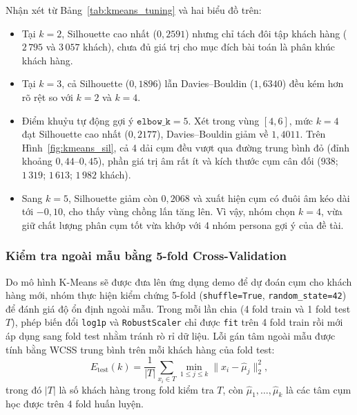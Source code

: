 \documentclass[12pt,a4paper]{article}
\numberwithin{equation}{section}
\numberwithin{table}{section}
\numberwithin{figure}{section}
\begin{document}
Nhận xét từ Bảng~\ref{tab:kmeans_tuning} và hai biểu đồ trên:
\begin{itemize}[leftmargin=1.5em]
    \item Tại $k = 2$, Silhouette cao nhất ($0,2591$) nhưng chỉ tách đôi tập khách hàng ($2\,795$ và $3\,057$ khách), chưa đủ giá trị cho mục đích bài toán là phân khúc khách hàng.
    \item Tại $k = 3$, cả Silhouette ($0,1896$) lẫn Davies--Bouldin ($1,6340$) đều kém hơn rõ rệt so với $k = 2$ và $k = 4$.
    \item Điểm khuỷu tự động gợi ý $\texttt{elbow\_k} = 5$. Xét trong vùng $[4, 6]$, mức $k = 4$ đạt Silhouette cao nhất ($0,2177$), Davies--Bouldin giảm về $1,4011$. Trên Hình~\ref{fig:kmeans_sil}, cả 4 dải cụm đều vượt qua đường trung bình đỏ (đỉnh khoảng $0,44\text{--}0,45$), phần giá trị âm rất ít và kích thước cụm cân đối ($938$; $1\,319$; $1\,613$; $1\,982$ khách).
    \item Sang $k = 5$, Silhouette giảm còn $0,2068$ và xuất hiện cụm có đuôi âm kéo dài tới $-0,10$, cho thấy vùng chồng lấn tăng lên. Vì vậy, nhóm chọn $k = 4$, vừa giữ chất lượng phân cụm tốt vừa khớp với 4 nhóm persona gợi ý của đề tài.
\end{itemize}

\subsubsection{Kiểm tra ngoài mẫu bằng 5-fold Cross-Validation}

Do mô hình K-Means sẽ được đưa lên ứng dụng demo để dự đoán cụm cho khách hàng mới, nhóm thực hiện kiểm chứng 5-fold (\texttt{shuffle=True}, \texttt{random\_state=42}) để đánh giá độ ổn định ngoài mẫu. Trong mỗi lần chia (4 fold train và 1 fold test $T$), phép biến đổi \texttt{log1p} và \texttt{RobustScaler} chỉ được \texttt{fit} trên 4 fold train rồi mới áp dụng sang fold test nhằm tránh rò rỉ dữ liệu. Lỗi gán tâm ngoài mẫu được tính bằng WCSS trung bình trên mỗi khách hàng của fold test:
\begin{equation}
    E_{\mathrm{test}}(k) = \frac{1}{|T|} \sum_{x_i \in T} \min_{1 \le j \le k} \lVert x_i - \hat{\mu}_j \rVert_2^2,
    \label{eq:cv_wcss}
\end{equation}
trong đó $|T|$ là số khách hàng trong fold kiểm tra $T$, còn $\hat{\mu}_1, \ldots, \hat{\mu}_k$ là các tâm cụm học được trên 4 fold huấn luyện.
\end{document}

